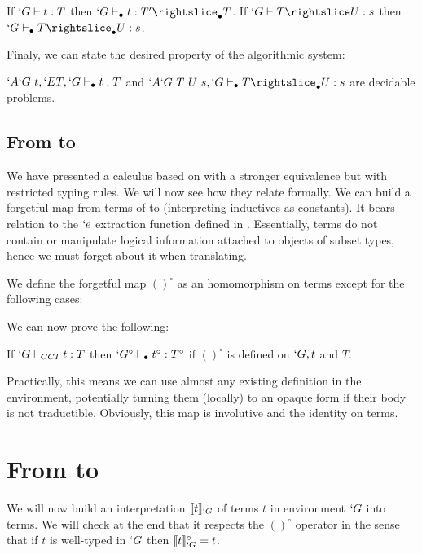 \documentclass{llncs}
\begin{document}
\begin{theorem}[Completeness]
  If $`G \vdash t : T$ then $`G \typea t : T' \suba T$.
  If $`G \typed T \subd U : s$ then $`G \typea T \suba U : s$.
\end{theorem}

Finaly, we can state the desired property of the algorithmic system:
\begin{theorem}
  $`A `G~t, `E T, `G \vdash_{\bullet} t : T$ and $`A `G~T~U~s, `G \typea T \suba U :
  s$ are decidable problems.
\end{theorem}

\subsection{From \CC to \lng{}}
We have presented a calculus based on \CC with a stronger equivalence
but with restricted typing rules. We will now see how they relate
formally.
We can build a forgetful map from terms of \CCI to \Russell
(interpreting inductives as constants). It bears
relation to the $`e$ extraction function defined in
\cite{Werner:ProofIrrelevance}. Essentially, \Russell{} terms do not
contain or manipulate logical information attached to objects of subset
types, hence we must forget about it when translating.

We define the forgetful map $()^{\circ}$ as an homomorphism on terms
except for the following cases:
\begin{center}
  \CCtoRussellforgetFig
\end{center}

We can now prove the following:
\begin{theorem}
  If $`G \vdash_{CCI} t : T$ then $`G^{\circ} \vdash_{\bullet} t^{\circ} : T^{\circ}$ if $()^{\circ}$ is
  defined on $`G, t$ and $T$.
\end{theorem}

Practically, this means we can use almost any existing definition in the
\Coq environment, potentially turning them (locally) to an opaque form
if their body is not traductible. Obviously, this map is involutive and
the identity on \Russell terms. 

\section{From \lng{} to \CCq{}}
We will now build an interpretation
$\llbracket t \rrbracket_{`G}$ of \Russell terms $t$ in environment $`G$ into \CCI
terms. We will check at the end that it respects the $()^{\circ}$ operator
in the sense that if $t$ is well-typed in $`G$ then $\llbracket t \rrbracket_{`G}^{\circ} = t$.
\end{document}
